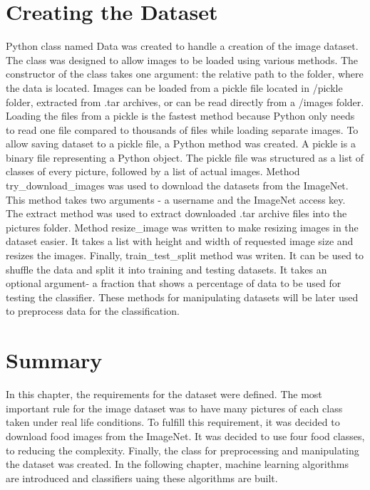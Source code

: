 \section {Creating the  Dataset}
Python class named Data was created to handle a creation of the image dataset. The class was designed to allow images to be loaded using various methods. The constructor of the class takes one argument: the relative path to the folder, where the data is located. Images can be loaded from a pickle file located in /pickle folder, extracted from .tar archives, or can be read directly from a /images folder. Loading the files from  a pickle is the fastest method because Python only needs to read one file compared to thousands of files while loading  separate images. To allow saving dataset to a pickle file,  a Python method was created. A pickle is a binary file representing a Python object. The pickle file was structured as a list of classes of every picture, followed by a list of actual images. Method try\_download\_images was used to download the  datasets from the  ImageNet. This method takes two arguments - a username and the ImageNet access key. The extract method   was  used to extract downloaded .tar archive files into the pictures folder. Method resize\_image was  written to  make  resizing  images in the dataset easier. It takes a list with height and width of requested image size and resizes the images.  Finally, train\_test\_split method was writen. It can be used to shuffle the data and split it into training and testing datasets. It takes an optional argument- a fraction that shows a percentage of data to be used for testing the classifier. These methods for manipulating datasets will be later used to preprocess data for the classification.

\section{Summary}
In this chapter, the requirements for the dataset were defined. The most important rule for the image dataset was to have many pictures of each class  taken under real life conditions. To fulfill this requirement, it was decided to download food images from the ImageNet. It was decided to use four food classes, to reducing the complexity. Finally, the class for preprocessing and manipulating the dataset was created.  In the following chapter, machine learning algorithms are introduced and classifiers uaing these algorithms are built.